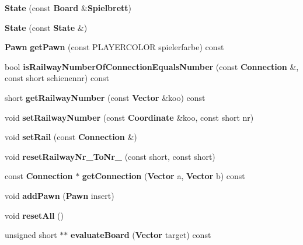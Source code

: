 \begin{DoxyCompactItemize}
\item 
{\bfseries State} (const {\bf Board} \&{\bf Spielbrett})\label{class_state_af4b0da86f50a141f59fe722fe2a521e5}

\item 
{\bfseries State} (const {\bf State} \&)\label{class_state_a5ca97340266d486dfa42225f19c40de3}

\item 
{\bf Pawn} {\bfseries get\-Pawn} (const P\-L\-A\-Y\-E\-R\-C\-O\-L\-O\-R spielerfarbe) const \label{class_state_a047b98fadf3b757656fa203e439d6c95}

\item 
bool {\bfseries is\-Railway\-Number\-Of\-Connection\-Equals\-Number} (const {\bf Connection} \&, const short schienennr) const \label{class_state_a0aab91520b80f52278908c673bb80779}

\item 
short {\bfseries get\-Railway\-Number} (const {\bf Vector} \&koo) const \label{class_state_a4ba85094883f4a79e0efd3cfc6088535}

\item 
void {\bfseries set\-Railway\-Number} (const {\bf Coordinate} \&koo, const short nr)\label{class_state_a170bfcb662e80c58f01608c441ddfce4}

\item 
void {\bfseries set\-Rail} (const {\bf Connection} \&)\label{class_state_ac05cee15165658aedfe46bca33e8436b}

\item 
void {\bfseries reset\-Railway\-Nr\-\_\-\-To\-Nr\-\_\-} (const short, const short)\label{class_state_a482b551469c15e5f88967ab6c42ca3dc}

\item 
const {\bf Connection} $\ast$ {\bfseries get\-Connection} ({\bf Vector} a, {\bf Vector} b) const \label{class_state_a720ae4c2d0f49932b0f117d9beb98863}

\item 
void {\bfseries add\-Pawn} ({\bf Pawn} insert)\label{class_state_a9a192466fc65d42a405b6c461f5ae1c7}

\item 
void {\bfseries reset\-All} ()\label{class_state_ae3cf3d6f8fd90d8a59d53ccb1290a46c}

\item 
unsigned short $\ast$$\ast$ {\bfseries evaluate\-Board} ({\bf Vector} target) const \label{class_state_a5bc0dd359e67c72d457a64277afaf621}


\end{DoxyCompactItemize}
